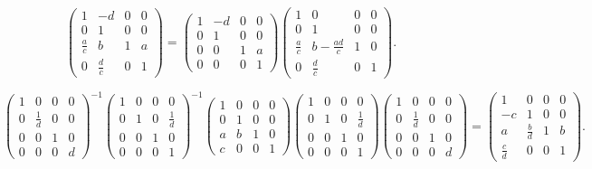 \documentclass[11pt]{amsart}
\begin{document}
$$
	\left(\begin{smallmatrix}
		1 & -d & 0 & 0 \\
		0 & 1 & 0 & 0 \\
		\frac{a}{c} & b & 1 & a \\
		0 & \frac{d}{c} & 0 & 1
	\end{smallmatrix}\right)
	=	\left(\begin{smallmatrix}
		1 & -d & 0 & 0 \\
		0 & 1 & 0 & 0 \\
		0 & 0 & 1 & a \\
		0 & 0 & 0 & 1
	\end{smallmatrix}\right) 
	\left(\begin{smallmatrix}
		1 & 0 & 0 & 0 \\
		0 & 1 & 0 & 0 \\
		\frac{a}{c} & b - \frac{a d}{c} & 1 & 0 \\
		0 & \frac{d}{c} & 0 & 1
	\end{smallmatrix}\right). 
$$

$$
	\left(\begin{smallmatrix}
		1 & 0 & 0 & 0 \\
		0 & \frac{1}{d} & 0 & 0 \\
		0 & 0 & 1 & 0 \\
		0 & 0 & 0 & d
	\end{smallmatrix}\right)^{-1} 
	\left(\begin{smallmatrix}
		1 & 0 & 0 & 0 \\
		0 & 1 & 0 & \frac{1}{d} \\
		0 & 0 & 1 & 0 \\
		0 & 0 & 0 & 1
	\end{smallmatrix}\right)^{-1}
	\left(\begin{smallmatrix}
		1 & 0 & 0 & 0 \\
		0 & 1 & 0 & 0 \\
		a & b & 1 & 0 \\
		c & 0 & 0 & 1
	\end{smallmatrix}\right) 
	\left(\begin{smallmatrix}
		1 & 0 & 0 & 0 \\
		0 & 1 & 0 & \frac{1}{d} \\
		0 & 0 & 1 & 0 \\
		0 & 0 & 0 & 1
	\end{smallmatrix}\right)
	\left(\begin{smallmatrix}
		1 & 0 & 0 & 0 \\
		0 & \frac{1}{d} & 0 & 0 \\
		0 & 0 & 1 & 0 \\
		0 & 0 & 0 & d
	\end{smallmatrix}\right) = \left(\begin{smallmatrix}
		1 & 0 & 0 & 0 \\
		-c & 1 & 0 & 0 \\
		a & \frac{b}{d} & 1 & b \\
		\frac{c}{d} & 0 & 0 & 1
	\end{smallmatrix}\right).
$$
\end{document}
